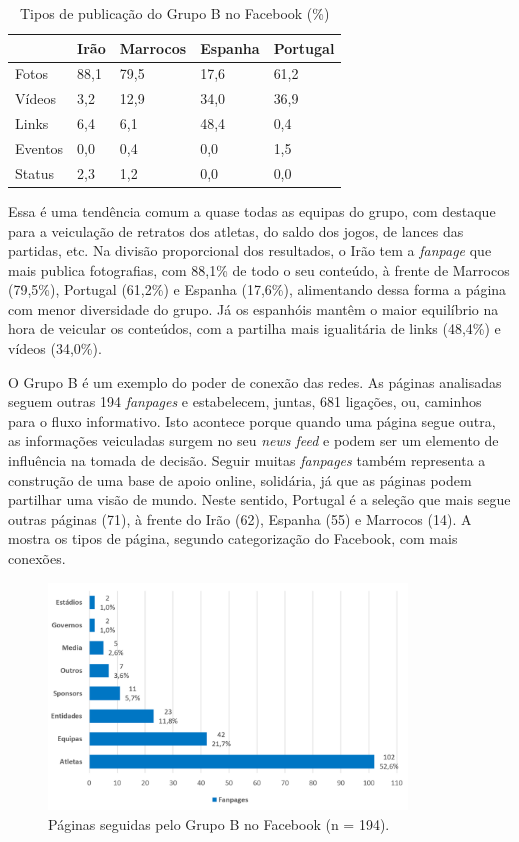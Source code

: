 \documentclass{textolivre}
\begin{document}
\begin{table}[htpb]
\caption{Tipos de publicação do Grupo B no Facebook (\%)}
\label{tbl02}
\centering
\begin{tabular}{lllll}
\toprule
& Irão & Marrocos & Espanha & Portugal
\\
\midrule
Fotos & 88,1 & 79,5 & 17,6 & 61,2
\\
Vídeos & 3,2 & 12,9 & 34,0 & 36,9
\\
Links & 6,4 & 6,1 & 48,4 & 0,4
\\
Eventos & 0,0 & 0,4 & 0,0 & 1,5
\\
Status & 2,3 & 1,2 & 0,0 & 0,0
\\
\bottomrule
\end{tabular}
\centering
{}
\end{table}

Essa é uma tendência comum a quase todas as equipas do grupo, com destaque para a veiculação de retratos dos atletas, do saldo dos jogos, de lances das partidas, etc. Na divisão proporcional dos resultados, o Irão tem a \emph{fanpage} que mais publica fotografias, com 88,1\% de todo o seu conteúdo, à frente de Marrocos (79,5\%), Portugal (61,2\%) e Espanha (17,6\%), alimentando dessa forma a página com menor diversidade do grupo. Já os espanhóis mantêm o maior equilíbrio na hora de veicular os conteúdos, com a partilha mais igualitária de links (48,4\%) e vídeos (34,0\%).

O Grupo B é um exemplo do poder de conexão das redes. As páginas analisadas seguem outras 194 \emph{fanpages} e estabelecem, juntas, 681 ligações, ou, caminhos para o fluxo informativo. Isto acontece porque quando uma página segue outra, as informações veiculadas surgem no seu \emph{news feed} e podem ser um elemento de influência na tomada de decisão. Seguir muitas \emph{fanpages} também representa a construção de uma base de apoio online, solidária, já que as páginas podem partilhar uma visão de mundo. Neste sentido, Portugal é a seleção que mais segue outras páginas (71), à frente do Irão (62), Espanha (55) e Marrocos (14). A  mostra os tipos de página, segundo categorização do Facebook, com mais conexões.

\begin{figure}[htbp]
 \centering
 \includegraphics[width=0.85\textwidth]{figure02.png}
 \caption{Páginas seguidas pelo Grupo B no Facebook (n = 194).}
 \label{fig2}
\end{figure}
\end{document}
